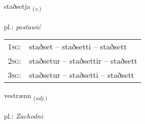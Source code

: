 \documentclass[frontgrid, backgrid]{flacards}\usepackage[]{graphicx}\usepackage[]{xcolor}
\begin{document}
{staðsetja \small{\textsubscript{(\textit{v.})}} \\[1ex] %
\textphonetic{[staðsɛtja]} \\
pl.: \emph{postawić} \\  [2ex]
\renewcommand*{\arraystretch}{0.8}
\begin{tabular}{p{1cm}l}
\textsc{1sg}: & staðset -- staðsetti -- staðsett \\ 
\textsc{2sg}: & staðsetur -- staðsettir -- staðsett \\ 
\textsc{3sg}: & staðsetur -- staðsetti -- staðsett \\ 
\end{tabular}
}

\renewcommand{\flhead}{\vskip5pt \fboxsep=0pt {\small\bfseries\footnotesize Lýsingarorð | przymiotnik}}
\renewcommand{\fcfoot}{\vskip5pt \fboxsep=0pt \hspace{2pt}{\small\bfseries\footnotesize 3K}}

\renewcommand{\blhead}{\vskip5pt {\small\bfseries\footnotesize Lýsingarorð | przymiotnik }}
\renewcommand{\bcfoot}{\vskip5pt \hspace{2pt}{\small\bfseries\footnotesize 3K}}


{vestrænn \small{\textsubscript{(\textit{adj.})}} \\[1ex] %
\textphonetic{[vɛstraitn̥]} \\
pl.: \emph{Zachodni} \\  [2ex]
\renewcommand*{\arraystretch}{0.8}
}

\renewcommand{\flhead}{\vskip5pt \fboxsep=0pt {\small\bfseries\footnotesize Nafnorð | rzeczownik}}
\renewcommand{\fcfoot}{\vskip5pt \fboxsep=0pt \hspace{2pt}{\small\bfseries\footnotesize 3K}}
\end{document}

